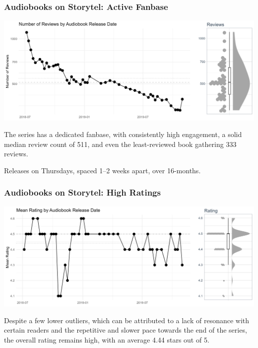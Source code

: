 \begin{frame}
    \frametitle{Audiobooks on Storytel: Active Fanbase}
    \includegraphics[width=\textwidth]{../R/figures/storytel_reviews}

    The series has a dedicated fanbase, with consistently high engagement, a solid median review count of 511,
    and even the least-reviewed book gathering 333 reviews.

    Releases on Thursdays, spaced 1--2 weeks apart, over 16-months.

\end{frame}

\begin{frame}
    \frametitle{Audiobooks on Storytel: High Ratings}
    \includegraphics[width=\textwidth]{../R/figures/storytel_ratings}

    Despite a few lower outliers, which can be attributed to a lack of resonance with certain readers and the
    repetitive and slower pace towards the end of the series, the overall rating remains high, with an average
    4.44 stars out of 5.

\end{frame}

